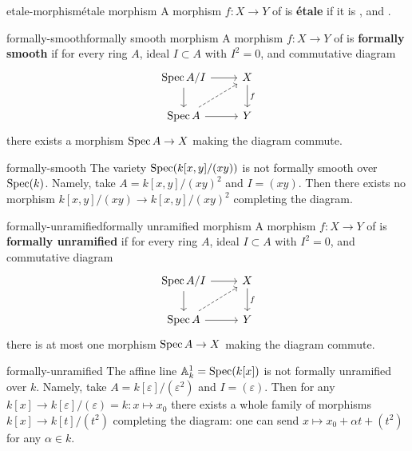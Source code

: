\begin{topic}{etale-morphism}{étale morphism}
    A morphism $f : X \to Y$ of  is \textbf{étale} if it is ,  and .
\end{topic}

\begin{topic}{formally-smooth}{formally smooth morphism}
    A morphism $f : X \to Y$ of  is \textbf{formally smooth} if for every ring $A$, ideal $I \subset A$ with $I^2 = 0$, and commutative diagram
    \[ \begin{tikzcd} \Spec A/I \arrow{r} \arrow{d} & X \arrow{d}{f} \\ \Spec A \arrow{r} \arrow[dashed]{ur} & Y \end{tikzcd} \]
    there exists a morphism $\operatorname{Spec} A \to X$ making the diagram commute.
\end{topic}

\begin{example}{formally-smooth}
    The variety $\operatorname{Spec}(k[x, y]/(xy))$ is not formally smooth over $\operatorname{Spec}(k)$. Namely, take $A = k[x, y] / (xy)^2$ and $I = (xy)$. Then there exists no morphism $k[x, y]/(xy) \to k[x, y]/(xy)^2$ completing the diagram.
\end{example}

\begin{topic}{formally-unramified}{formally unramified morphism}
    A morphism $f : X \to Y$ of  is \textbf{formally unramified} if for every ring $A$, ideal $I \subset A$ with $I^2 = 0$, and commutative diagram
    \[ \begin{tikzcd} \Spec A/I \arrow{r} \arrow{d} & X \arrow{d}{f} \\ \Spec A \arrow{r} \arrow[dashed]{ur} & Y \end{tikzcd} \]
    there is at most one morphism $\operatorname{Spec} A \to X$ making the diagram commute.
\end{topic}

\begin{example}{formally-unramified}
    The affine line $\mathbb{A}^1_k = \operatorname{Spec}(k[x])$ is not formally unramified over $k$. Namely, take $A = k[\varepsilon] / (\varepsilon^2)$ and $I = (\varepsilon)$. Then for any $k[x] \to k[\varepsilon]/(\varepsilon) = k : x \mapsto x_0$ there exists a whole family of morphisms $k[x] \to k[t]/(t^2)$ completing the diagram: one can send $x \mapsto x_0 + \alpha t + (t^2)$ for any $\alpha \in k$.
\end{example}

